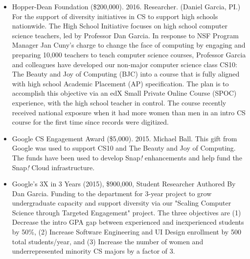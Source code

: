 \begin{itemize}
    \item{Hopper-Dean Foundation (\$200,000). 2016. Researcher. (Daniel Garcia, PI.)}
    \newline\small{For the support of diversity initiatives in CS to support high schools nationwide. The High School Initiative focuses on high school computer science teachers, led by Professor Dan Garcia. In response to NSF Program Manager Jan Cuny’s charge to change the face of computing by engaging and preparing 10,000 teachers to teach computer science courses, Professor Garcia and colleagues have developed our non-major computer science class CS10: The Beauty and Joy of Computing (BJC) into a course that is fully aligned with high school Academic Placement (AP) specification. The plan is to accomplish this objective via an edX Small Private Online Course (SPOC) experience, with the high school teacher in control. The course recently received national exposure when it had more women than men in an intro CS course for the first time since records were digitized.}

    \item{Google CS Engagement Award (\$5,000). 2015. Michael Ball.}
    \newline\small{This gift from Google was used to support CS10 and The Beauty and Joy of Computing. The funds have been used to develop Snap\textit{!} enhancements and help fund the Snap\textit{!} Cloud infrastructure.}
    
    \item{Google’s 3X in 3 Years (2015), \$900,000, Student  Researcher
    Authored By Dan Garcia. Funding to the department for 3-year project to grow undergraduate capacity and support diversity via our "Scaling Computer Science through Targeted Engagement" project. The three objectives are (1) Decrease the intro GPA gap between experienced and inexperienced students by 50\%, (2) Increase Software Engineering and UI Design enrollment by 500 total students/year, and (3) Increase the number of women and underrepresented minority CS majors by a factor of 3.}
    

\end{itemize}
